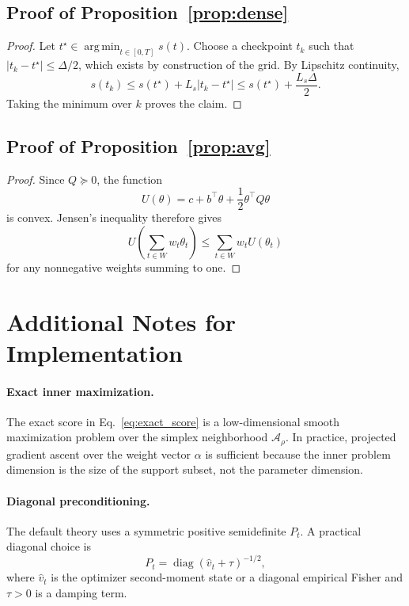\documentclass{article}
\newcommand{\argmin}{\operatorname*{arg\,min}}
\newcommand{\diag}{\operatorname{diag}}
\begin{document}
\subsection{Proof of Proposition~\ref{prop:dense}}

\begin{proof}
Let $t^\star \in \argmin_{t \in [0,T]} s(t)$. Choose a checkpoint $t_k$ such that $|t_k - t^\star| \le \Delta/2$, which exists by construction of the grid. By Lipschitz continuity,
\begin{equation}
    s(t_k)
    \le
    s(t^\star) + L_s |t_k - t^\star|
    \le
    s(t^\star) + \frac{L_s \Delta}{2}.
\end{equation}
Taking the minimum over $k$ proves the claim.
\end{proof}

\subsection{Proof of Proposition~\ref{prop:avg}}

\begin{proof}
Since $Q \succeq 0$, the function
\begin{equation}
    U(\theta) = c + b^\top \theta + \frac{1}{2}\theta^\top Q \theta
\end{equation}
is convex. Jensen's inequality therefore gives
\begin{equation}
    U\!\left(\sum_{t \in W} w_t \theta_t\right)
    \le
    \sum_{t \in W} w_t U(\theta_t)
\end{equation}
for any nonnegative weights summing to one.
\end{proof}

\section{Additional Notes for Implementation}

\paragraph{Exact inner maximization.}
The exact score in Eq.~\eqref{eq:exact_score} is a low-dimensional smooth maximization problem over the simplex neighborhood $\mathcal{A}_{\rho}$. In practice, projected gradient ascent over the weight vector $\alpha$ is sufficient because the inner problem dimension is the size of the support subset, not the parameter dimension.

\paragraph{Diagonal preconditioning.}
The default theory uses a symmetric positive semidefinite $P_t$. A practical diagonal choice is
\begin{equation}
    P_t = \diag(\hat v_t + \tau)^{-1/2},
\end{equation}
where $\hat v_t$ is the optimizer second-moment state or a diagonal empirical Fisher and $\tau > 0$ is a damping term.
\end{document}

